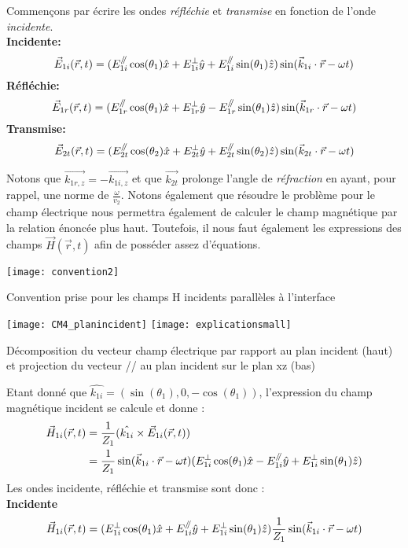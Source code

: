  Commençons par écrire les ondes \textit{réfléchie} et \textit{transmise} en fonction de l'onde \textit{incidente}.\\
\textbf{Incidente:} $$ \vec{E}_{1i} (\vec{r},t) = (E^{\mathbin{/\mkern-5mu/}}_{1i} \cos(\theta_{1})  \hat{x} + E_{1i}^{\perp} \hat{y} + E_{1i}^{\mathbin{/\mkern-5mu/}} \sin(\theta_{1}) \hat{z} ) \sin(\vec{k}_{1i}\cdot \vec{r} - \omega t) $$  
\textbf{Réfléchie:}  $$ \vec{E}_{1r} (\vec{r},t) = (E^{\mathbin{/\mkern-5mu/}}_{1r} \cos(\theta_{1})  \hat{x} + E_{1r}^{\perp} \hat{y} - E_{1r}^{\mathbin{/\mkern-5mu/}} \sin(\theta_{1}) \hat{z} ) \sin(\vec{k}_{1r}\cdot \vec{r} - \omega t) $$
\textbf{Transmise:}$$ \vec{E}_{2t} (\vec{r},t) = (E^{\mathbin{/\mkern-5mu/}}_{2t} \cos(\theta_{2})  \hat{x} + E_{2t}^{\perp} \hat{y} + E_{2t}^{\mathbin{/\mkern-5mu/}} \sin(\theta_{2}) \hat{z} ) \sin(\vec{k}_{2t}\cdot \vec{r} - \omega t) $$ 
 
Notons que $\vec{k_{1r,z}} = - \vec{k_{1i,z}}$ et que $\vec{k_{2t}}$ prolonge l'angle de \textit{réfraction} en ayant, pour rappel, une norme de $\frac{\omega}{v_{2}}$.
Notons également que résoudre le problème pour le champ électrique nous permettra également de calculer le champ magnétique par la relation énoncée plus haut.
Toutefois, il nous faut également les expressions des champs $\vec{H}(\vec{r},t)$ afin de posséder assez d'équations.

\begin{marginfigure}
\texttt{[image: convention2]}
\caption{Convention prise pour les champs H incidents parallèles à l'interface}
\label{fig_convention2}
\end{marginfigure}
\begin{marginfigure}
\texttt{[image: CM4\_planincident]}
\texttt{[image: explicationsmall]}
\caption{Décomposition du vecteur champ électrique par rapport au plan incident (haut) et projection du vecteur // au plan incident sur le plan xz (bas)}
\label{decomp}
\end{marginfigure}

Etant donné que $\hat{k_{1i}} = (\sin(\theta_{1}),0,-\cos(\theta_{1})) $, l'expression du champ magnétique incident se calcule et donne :
\begin{equation*}
\begin{split}
\vec{H}_{1i}(\vec{r},t)& = \frac{1}{Z_1} (\hat{k_{1i}} \times \vec{E}_{1i}(\vec{r},t))\\ &= \frac{1}{Z_1} \sin(\vec{k}_{1i}\cdot \vec{r} - \omega t)(E^{\perp}_{1i}\cos(\theta_{1}) \hat{x} - E^{\mathbin{/\mkern-5mu/}}_{1i} \hat{y} + E^{\perp}_{1i}\sin(\theta_{1}) \hat{z} )
\end{split}
\end{equation*}
Les ondes incidente, réfléchie et transmise sont donc :\\ 
\textbf{Incidente} $$ \vec{H}_{1i} (\vec{r},t) = (E^{\perp}_{1i}\cos(\theta_{1}) \hat{x} + E^{\mathbin{/\mkern-5mu/}}_{1i} \hat{y} + E^{\perp}_{1i}\sin(\theta_{1}) \hat{z} ) \frac{1}{Z_1} \sin(\vec{k}_{1i}\cdot \vec{r} - \omega t)$$

